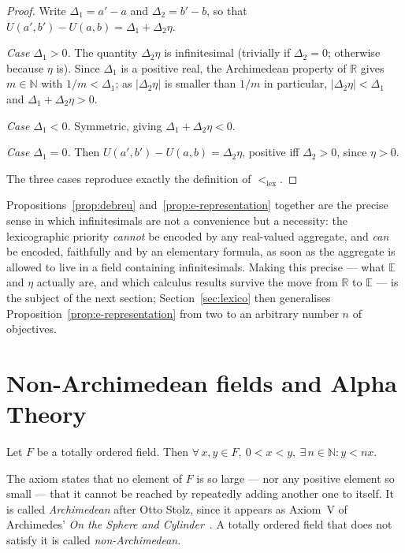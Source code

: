 \begin{proof}
Write $\Delta_1 = a' - a$ and $\Delta_2 = b' - b$, so that
$U(a',b') - U(a,b) = \Delta_1 + \Delta_2\eta$.

\emph{Case $\Delta_1 > 0$.} The quantity $\Delta_2 \eta$ is infinitesimal (trivially
if $\Delta_2=0$; otherwise because $\eta$ is). Since $\Delta_1$ is a positive real, the
Archimedean property of $\mathbb{R}$ gives $m \in \mathbb{N}$ with $1/m < \Delta_1$;
as $|\Delta_2\eta|$ is smaller than $1/m$ in particular, $|\Delta_2\eta| < \Delta_1$
and $\Delta_1 + \Delta_2\eta > 0$.

\emph{Case $\Delta_1 < 0$.} Symmetric, giving $\Delta_1 + \Delta_2\eta < 0$.

\emph{Case $\Delta_1 = 0$.} Then $U(a',b') - U(a,b) = \Delta_2\eta$, positive iff
$\Delta_2 > 0$, since $\eta > 0$.

The three cases reproduce exactly the definition of $<_{\mathrm{lex}}$.
\end{proof}

Propositions~\ref{prop:debreu} and~\ref{prop:e-representation} together are the
precise sense in which infinitesimals are not a convenience but a necessity: the
lexicographic priority \emph{cannot} be encoded by any real-valued aggregate, and
\emph{can} be encoded, faithfully and by an elementary formula, as soon as the
aggregate is allowed to live in a field containing infinitesimals. Making this
precise --- what $\mathbb{E}$ and $\eta$ actually are, and which calculus results
survive the move from $\mathbb{R}$ to $\mathbb{E}$ --- is the subject of the next
section; Section~\ref{sec:lexico} then generalises
Proposition~\ref{prop:e-representation} from two to an arbitrary number $n$ of
objectives.

\section{Non-Archimedean fields and Alpha Theory}
\label{sec:alpha}

\begin{axiom}
\label{ax:archimedes}
Let $F$ be a totally ordered field. Then
$\forall\, x,y \in F,\ 0 < x < y,\ \exists\, n \in \mathbb{N} : y < nx$.
\end{axiom}

The axiom states that no element of $F$ is so large --- nor any positive element so
small --- that it cannot be reached by repeatedly adding another one to itself. It is
called \emph{Archimedean} after Otto Stolz, since it appears as Axiom~V of
Archimedes' \emph{On the Sphere and Cylinder}~\cite{benci2022nonstandard}. A totally
ordered field that does not satisfy it is called \emph{non-Archimedean}.

